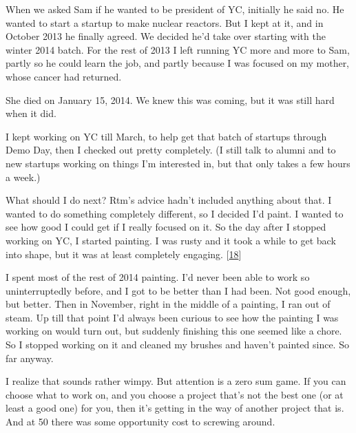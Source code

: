 When
                  we asked Sam if he wanted to be president of YC, initially he
                  said no. He wanted to start a startup to make nuclear
                  reactors. But I kept at it, and in October 2013 he finally
                  agreed. We decided he'd take over starting with the winter
                  2014 batch. For the rest of 2013 I left running YC more and
                  more to Sam, partly so he could learn the job, and partly
                  because I was focused on my mother, whose cancer had
                  returned.

She died on January 15, 2014. We knew
                  this was coming, but it was still hard when it did.

I
                  kept working on YC till March, to help get that batch of
                  startups through Demo Day, then I checked out pretty
                  completely. (I still talk to alumni and to new startups
                  working on things I'm interested in, but that only takes a few
                  hours a week.)

What should I do next? Rtm's advice
                  hadn't included anything about that. I wanted to do something
                  completely different, so I decided I'd paint. I wanted to see
                  how good I could get if I really focused on it. So the day
                  after I stopped working on YC, I started painting. I was rusty
                  and it took a while to get back into shape, but it was at
                  least completely engaging.
                  [\href{\#f18n}{18}]

I spent most of the rest of 2014 painting. I'd
                  never been able to work so uninterruptedly before, and I got
                  to be better than I had been. Not good enough, but better.
                  Then in November, right in the middle of a painting, I ran out
                  of steam. Up till that point I'd always been curious to see
                  how the painting I was working on would turn out, but suddenly
                  finishing this one seemed like a chore. So I stopped working
                  on it and cleaned my brushes and haven't painted since. So far
                  anyway.

I realize that sounds rather wimpy. But
                  attention is a zero sum game. If you can choose what to work
                  on, and you choose a project that's not the best one (or at
                  least a good one) for you, then it's getting in the way of
                  another project that is. And at 50 there was some opportunity
                  cost to screwing around.

